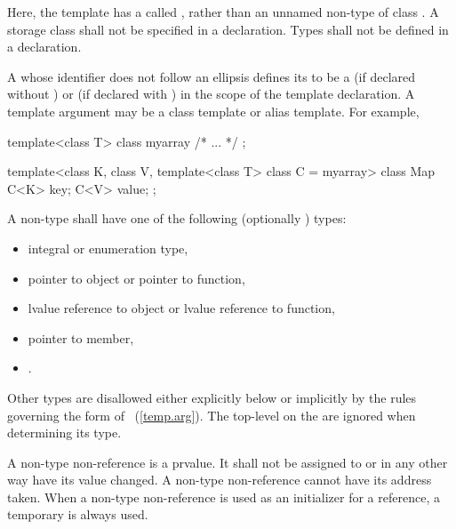 Here, the template  has a 
called , rather than an unnamed non-type
 of class .
\exitexample
A storage class shall not be specified in a
declaration.
Types shall not be defined in a 
declaration.

\pnum
A
whose identifier does not follow an ellipsis
defines its
to be a
(if declared without
)
or
(if declared with
)
in the scope of the template declaration.
\enternote
A template argument may be a class template or alias template.
For example,

\begin{codeblock}
template<class T> class myarray { /* ... */ };

template<class K, class V, template<class T> class C = myarray>
class Map {
  C<K> key;
  C<V> value;
};
\end{codeblock}
\exitnote

\pnum
A non-type
shall have one of the following (optionally
)
types:

\begin{itemize}
\item integral or enumeration type,

\item pointer to object or pointer to function,

\item lvalue reference to object or lvalue reference to function,

\item pointer to member,

\item {}.
\end{itemize}

\pnum
\enternote
Other types are disallowed either explicitly below or implicitly by
the rules governing the form of
~(\ref{temp.arg}).
\exitnote
The top-level
on the
are ignored when determining its type.

\pnum
A non-type non-reference
is a prvalue.
It shall not be assigned to or in any other way have its value changed.
A non-type non-reference
cannot have its address taken.
When a non-type non-reference
is used as an initializer for a reference, a temporary is always used.
\enterexample

